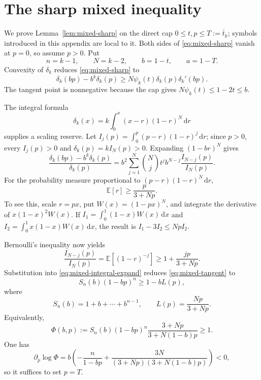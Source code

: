 \documentclass[11pt]{article}
\theoremstyle{definition}
\theoremstyle{remark}
\newcommand{\E}{\mathbb{E}}
\begin{document}
\section{The sharp mixed inequality}\label{app:mixed-sharp}

We prove Lemma~\ref{lem:mixed-sharp} on the direct cap
$0\le t,p\le T:=\bar t_k$; symbols introduced in this appendix are local
to it.  Both sides of \eqref{eq:mixed-sharp} vanish at $p=0$, so assume
$p>0$.  Put
\[
 n=k-1,\qquad N=k-2,\qquad b=1-t,\qquad a=1-T.
\]
Convexity of $\delta_k$ reduces \eqref{eq:mixed-sharp} to
\begin{equation}\label{eq:mixed-tangent}
 \delta_k(bp)-b^k\delta_k(p)
 \ge N\psi_k(t)\delta_k(p)\delta_k'(bp).
\end{equation}
The tangent point is nonnegative because the cap gives
$N\psi_k(t)\le1-2t\le b$.

The integral formula
\begin{equation}\label{eq:delta-integral}
 \delta_k(x)=k\int_0^x(x-r)(1-r)^N\,\mathrm d r
\end{equation}
supplies a scaling reserve.  Let
$I_j(p)=\int_0^p(p-r)(1-r)^j\,\mathrm d r$; since $p>0$, every
$I_j(p)>0$ and $\delta_k(p)=kI_N(p)>0$.  Expanding
$(1-br)^N$ gives
\begin{equation}\label{eq:mixed-integral-expand}
 \frac{\delta_k(bp)-b^k\delta_k(p)}{\delta_k(p)}
 =b^2\sum_{j=1}^N\binom Nj t^jb^{N-j}\frac{I_{N-j}(p)}{I_N(p)}.
\end{equation}
For the probability measure proportional to
$(p-r)(1-r)^N\,\mathrm d r$,
\begin{equation}\label{eq:mixed-moment}
 \E[r]\ge\frac{p}{3+Np}.
\end{equation}
To see this, scale $r=px$, put $W(x)=(1-px)^N$, and integrate the derivative
of $x(1-x)^2W(x)$.  If
$I_1=\int_0^1(1-x)W(x)\,\mathrm d x$ and
$I_2=\int_0^1x(1-x)W(x)\,\mathrm d x$, the result is
$I_1-3I_2\le NpI_2$.

Bernoulli's inequality now yields
\[
 \frac{I_{N-j}(p)}{I_N(p)}
 =\E[(1-r)^{-j}]
 \ge1+\frac{jp}{3+Np}.
\]
Substitution into \eqref{eq:mixed-integral-expand} reduces
\eqref{eq:mixed-tangent} to
\begin{equation}\label{eq:mixed-elementary}
 S_n(b)(1-bp)^n\ge1-bL(p),
\end{equation}
where
\[
 S_n(b)=1+b+\cdots+b^{n-1},\qquad
 L(p)=\frac{Np}{3+Np}.
\]
Equivalently,
\begin{equation}\label{eq:Phi}
 \Phi(b,p):=S_n(b)(1-bp)^n
 \frac{3+Np}{3+N(1-b)p}\ge1.
\end{equation}
One has
\[
 \partial_p\log\Phi
 =b\left(-\frac n{1-bp}
 +\frac{3N}{(3+Np)(3+N(1-b)p)}\right)<0,
\]
so it suffices to set $p=T$.
\end{document}
